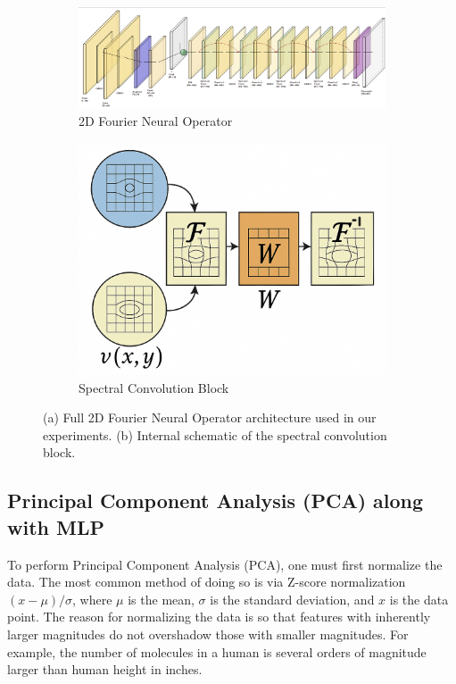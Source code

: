 \documentclass{article}
\begin{document}
\begin{figure}
    \centering
    \begin{subfigure}[b]{0.6\linewidth}
        \centering
        \includegraphics[width=\linewidth]{figures/FNO2D.png}
        \caption{2D Fourier Neural Operator}
    \end{subfigure}
    \hfill
    \begin{subfigure}[b]{0.3\linewidth}
        \centering
        \includegraphics[width=\linewidth]{figures/spectralconv2d.png}
        \caption{Spectral Convolution Block}
    \end{subfigure}
    \caption{(a) Full 2D Fourier Neural Operator architecture used in our experiments. (b) Internal schematic of the spectral convolution block.}
    \label{fig:fno-2d}
\end{figure}

\subsection{Principal Component Analysis (PCA) along with MLP} 

To perform Principal Component Analysis (PCA), one must first normalize the data. The most common method of doing so is via Z-score normalization $(x - \mu)/\sigma$, where $\mu$ is the mean, $\sigma$ is the standard deviation, and $x$ is the data point. The reason for normalizing the data is so that features with inherently larger magnitudes do not overshadow those with smaller magnitudes. For example, the number of molecules in a human is several orders of magnitude larger than human height in inches.
\end{document}
